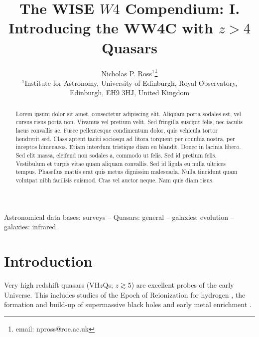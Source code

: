 \documentclass[usenatbib]{mnras}
\begin{document}
\title[WW4C I: Very high-$z$ Quasars]
      {The WISE $W4$ Compendium: I. Introducing the WW4C with $z>4$ Quasars}
\author[N.P. Ross et al.]
       {Nicholas P. Ross$^{1}$\thanks{email: npross@roe.ac.uk}\\ 
$^1$Institute for Astronomy, University of Edinburgh, Royal Observatory, Edinburgh, EH9 3HJ, United Kingdom\\
}

\maketitle
\begin{abstract}
Lorem ipsum dolor sit amet, consectetur adipiscing elit. Aliquam porta
sodales est, vel cursus risus porta non. Vivamus vel pretium
velit. Sed fringilla suscipit felis, nec iaculis lacus convallis
ac. Fusce pellentesque condimentum dolor, quis vehicula tortor
hendrerit sed. Class aptent taciti sociosqu ad litora torquent per
conubia nostra, per inceptos himenaeos. Etiam interdum tristique diam
eu blandit. Donec in lacinia libero.
Sed elit massa, eleifend non sodales a, commodo ut felis. Sed id
pretium felis. Vestibulum et turpis vitae quam aliquam convallis. Sed
id ligula eu nulla ultrices tempus. Phasellus mattis erat quis metus
dignissim malesuada. Nulla tincidunt quam volutpat nibh facilisis
euismod. Cras vel auctor neque. Nam quis diam risus.
\end{abstract}


\begin{keywords}
Astronomical data bases: surveys -- 
Quasars: general -- 
galaxies: evolution -- 
galaxies: infrared.
\end{keywords}



\section{Introduction}
Very high redshift quasars (VH$z$Qs; $z\gtrsim5$) are excellent probes
of the early Universe. This includes studies of the Epoch of
Reionization for hydrogen \citep[see e.g.][for reviews]{Fan2006review,
Mortlock2016}, the formation and build-up of supermassive black holes
\citep[e.g., ][]{Rees1984, WyitheLoeb2003, Volonteri2010, Agarwal2016,
Valiante2018, Latif2018} and early metal enrichment \citep[see e.g.,
][]{Simcoe2012, Chen2017, Bosman2017}.
\end{document}
